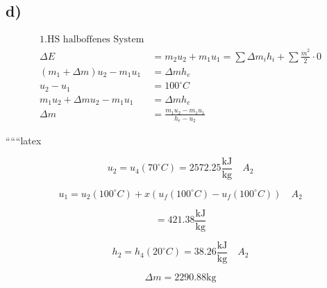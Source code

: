 

\subsection*{d)}
\begin{align*}
\text{1.HS halboffenes System} \\
\Delta E &= m_2 u_2 + m_1 u_1 = \sum \Delta m_i h_i + \sum \frac{\dot{m}^2}{2} \cdot 0 \\
(m_1 + \Delta m) u_2 - m_1 u_1 &= \Delta m h_e \\
u_2 - u_1 &= 100^\circ C \\
m_1 u_2 + \Delta m u_2 - m_1 u_1 &= \Delta m h_e \\
\Delta m &= \frac{m_1 u_2 - m_1 u_1}{h_e - u_2}
\end{align*}

``````latex


\[
u_2 = u_4 (70^\circ C) = 2572.25 \frac{\text{kJ}}{\text{kg}} \quad A_2
\]

\[
u_1 = u_2 (100^\circ C) + x (u_f (100^\circ C) - u_f (100^\circ C)) \quad A_2
\]

\[
= 421.38 \frac{\text{kJ}}{\text{kg}}
\]

\[
h_2 = h_4 (20^\circ C) = 38.26 \frac{\text{kJ}}{\text{kg}} \quad A_2
\]

\[
\Delta m = 2290.88 \text{kg}
\]
